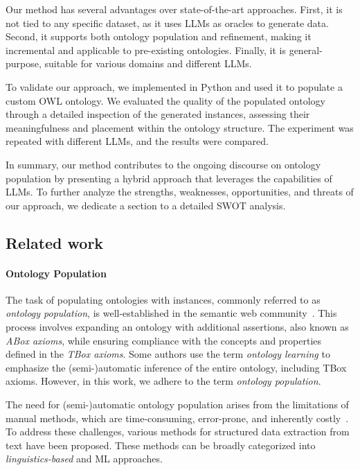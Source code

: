Our method has several advantages over state-of-the-art approaches.
%
First, it is not tied to any specific dataset, as it uses \glspl{LLM} as oracles to generate data.
%
Second, it supports both ontology population and refinement, making it incremental and applicable to pre-existing ontologies.
%
Finally, it is general-purpose, suitable for various domains and different \glspl{LLM}.


To validate our approach, we implemented \llmfkg{} in Python and used it to populate a custom \gls{OWL} ontology.
%
We evaluated the quality of the populated ontology through a detailed inspection of the generated instances, assessing their meaningfulness and placement within the ontology structure.
%
The experiment was repeated with different \glspl{LLM}, and the results were compared.


In summary, our method contributes to the ongoing discourse on ontology population by presenting a hybrid approach that leverages the capabilities of \glspl{LLM}.
%
To further analyze the strengths, weaknesses, opportunities, and threats of our approach, we dedicate a section to a detailed \gls{SWOT} analysis.


\subsection{Related work}
\label{subsec:related-work-kgfiller}

\paragraph{Ontology Population}
\label{par:related-workd-ontology-population}
%
The task of populating ontologies with instances, commonly referred to as \emph{ontology population}, is well-established in the semantic web community~\cite{lubani-2019}.
%
This process involves expanding an ontology with additional assertions, also known as \emph{ABox axioms}, while ensuring compliance with the concepts and properties defined in the \emph{TBox axioms}.
%
Some authors use the term \emph{ontology learning} to emphasize the (semi-)automatic inference of the entire ontology, including TBox axioms.
%
However, in this work, we adhere to the term \emph{ontology population}.


The need for (semi-)automatic ontology population arises from the limitations of manual methods, which are time-consuming, error-prone, and inherently costly~\cite{cherifa-2021}.
%
To address these challenges, various methods for structured data extraction from text have been proposed.
%
These methods can be broadly categorized into \emph{linguistics-based} and \gls{ML} approaches.


